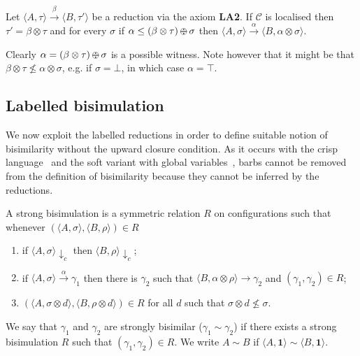 \documentclass{llncs}
\def\C{{\mathcal C}}
\def\monid{{\mathbf 0}}
\def\C{{\mathcal C}}
\def\odiv{\, {\ominus\hspace{-7.7pt} \div} \,}
\def\monid{\mathbf{1}}
\begin{document}
\begin{lemma}[Completeness, II]
\label{LA2}
Let $\langle A, \tau \rangle \xrightarrow{\beta} \langle B, \tau' \rangle$ be a reduction 
via the axiom {\bf LA2}. If $\C$ is localised then $\tau' = \beta \otimes \tau$
and for every $\sigma$ if $\alpha \leq (\beta \otimes \tau) \odiv \sigma$ then
$\langle A, \sigma \rangle \xrightarrow{\alpha} \langle B, \alpha \otimes \sigma \rangle$.
\end{lemma}


Clearly $\alpha = (\beta \otimes \tau) \odiv \sigma$ is a possible witness. Note however that 
it might be that $\beta \otimes \tau \not \leq \alpha \otimes \sigma$,
e.g. if $\sigma = \bot$, in which case $\alpha = \top$.


%




\subsection{Labelled bisimulation}\label{sec:bisimilarity}
We now exploit the labelled reductions in order to define suitable notion of bisimilarity without the upward closure condition.
As it occurs with the crisp language~\cite{pippo} and the soft variant with global variables~\cite{festcatuscia}, 
barbs cannot be removed from the 
definition of bisimilarity because they cannot be inferred by the reductions.

\begin{definition}\label{def:strongbis} A strong bisimulation is a symmetric relation $R$ on configurations such that whenever
$( \langle A, \sigma \rangle,\langle B, \rho \rangle) \in R$
\begin{enumerate}
\item if $\langle A, \sigma \rangle \downarrow_c$ then $\langle B, \rho \rangle \downarrow_c$;
\item if $\langle A, \sigma \rangle \xrightarrow{\alpha} \gamma_1$ then there is $\gamma_2$ such that $\langle B, \alpha \otimes \rho \rangle \to \gamma_2$ 
and $(\gamma_1, \gamma_2) \in R$;
\item $(\langle A,\sigma \otimes d\rangle, \langle B,\rho \otimes d \rangle) \in R$ for  all $d$ such that $\sigma \otimes d \not \leq \sigma$. 
\end{enumerate}
We say that $\gamma_1$ and $\gamma_2$ are  strongly bisimilar ($\gamma_1  \sim \gamma_2$) if there exists a strong  bisimulation 
$R$ such that $(\gamma_1 , \gamma_2 ) \in R$. We write $A \sim B$ if $\langle A, \monid \rangle \sim \langle B, \monid \rangle$.
\end{definition}
\end{document}
